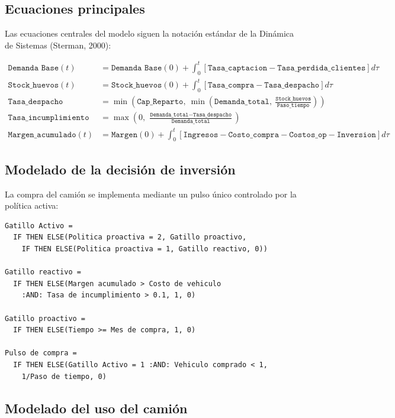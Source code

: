 \documentclass[10pt,a4paper]{article}
\begin{document}
\subsection{Ecuaciones principales}

Las ecuaciones centrales del modelo siguen la notación estándar de la Dinámica de Sistemas (Sterman, 2000):

\begin{align}
\texttt{Demanda Base}(t) &= \texttt{Demanda Base}(0) + \int_0^t \left[\texttt{Tasa\_captacion} - \texttt{Tasa\_perdida\_clientes}\right] d\tau \\
\texttt{Stock\_huevos}(t) &= \texttt{Stock\_huevos}(0) + \int_0^t \left[\texttt{Tasa\_compra} - \texttt{Tasa\_despacho}\right] d\tau \\
\texttt{Tasa\_despacho} &= \min\left(\texttt{Cap\_Reparto},\ \min\left(\texttt{Demanda\_total},\ \frac{\texttt{Stock\_huevos}}{\texttt{Paso\_tiempo}}\right)\right) \\
\texttt{Tasa\_incumplimiento} &= \max\left(0,\ \frac{\texttt{Demanda\_total} - \texttt{Tasa\_despacho}}{\texttt{Demanda\_total}}\right) \\
\texttt{Margen\_acumulado}(t) &= \texttt{Margen}(0) + \int_0^t \left[\texttt{Ingresos} - \texttt{Costo\_compra} - \texttt{Costos\_op} - \texttt{Inversion}\right] d\tau
\end{align}

\subsection{Modelado de la decisión de inversión}

La compra del camión se implementa mediante un pulso único controlado por la política activa:

\begin{lstlisting}[caption={Lógica de gatillo y pulso de compra (Vensim)}]
Gatillo Activo =
  IF THEN ELSE(Politica proactiva = 2, Gatillo proactivo,
    IF THEN ELSE(Politica proactiva = 1, Gatillo reactivo, 0))

Gatillo reactivo =
  IF THEN ELSE(Margen acumulado > Costo de vehiculo
    :AND: Tasa de incumplimiento > 0.1, 1, 0)

Gatillo proactivo =
  IF THEN ELSE(Tiempo >= Mes de compra, 1, 0)

Pulso de compra =
  IF THEN ELSE(Gatillo Activo = 1 :AND: Vehiculo comprado < 1,
    1/Paso de tiempo, 0)
\end{lstlisting}

\subsection{Modelado del uso del camión}
\end{document}
